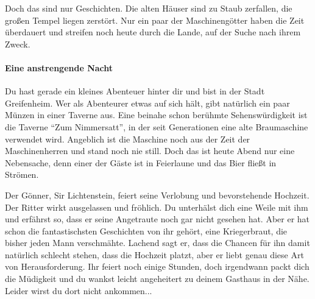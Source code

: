 Doch das sind nur Geschichten. Die alten Häuser sind zu Staub zerfallen, die großen Tempel liegen zerstört. Nur ein paar der Maschinengötter haben die Zeit überdauert und streifen noch heute durch die Lande, auf der Suche nach ihrem Zweck.

\paragraph{Eine anstrengende Nacht}

Du hast gerade ein kleines Abenteuer hinter dir und bist in der Stadt Greifenheim. Wer als Abenteurer etwas auf sich hält, gibt natürlich ein paar Münzen in einer Taverne aus. Eine beinahe schon berühmte Sehenswürdigkeit ist die Taverne ``Zum Nimmersatt'', in der seit Generationen eine alte Braumaschine verwendet wird. Angeblich ist die Maschine noch aus der Zeit der Maschinenherren und stand noch nie still. Doch das ist heute Abend nur eine Nebensache, denn einer der Gäste ist in Feierlaune und das Bier fließt in Strömen.

Der Gönner, Sir Lichtenstein, feiert seine Verlobung und bevorstehende Hochzeit. Der Ritter wirkt ausgelassen und fröhlich. Du unterhälst dich eine Weile mit ihm und erfährst so, dass er seine Angetraute noch gar nicht gesehen hat. Aber er hat schon die fantastischsten Geschichten von ihr gehört, eine Kriegerbraut, die bisher jeden Mann verschmähte. Lachend sagt er, dass die Chancen für ihn damit natürlich schlecht stehen, dass die Hochzeit platzt, aber er liebt genau diese Art von Herausforderung. Ihr feiert noch einige Stunden, doch irgendwann packt dich die Müdigkeit und du wankst leicht angeheitert zu deinem Gasthaus in der Nähe. Leider wirst du dort nicht ankommen...
